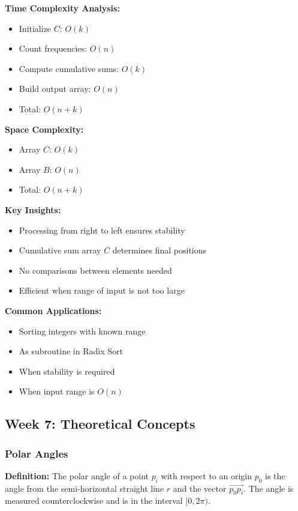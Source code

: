 \textbf{Time Complexity Analysis:}
\begin{itemize}[noitemsep]
    \item Initialize $C$: $O(k)$
    \item Count frequencies: $O(n)$
    \item Compute cumulative sums: $O(k)$
    \item Build output array: $O(n)$
    \item Total: $O(n + k)$
\end{itemize}

\textbf{Space Complexity:}
\begin{itemize}[noitemsep]
    \item Array $C$: $O(k)$
    \item Array $B$: $O(n)$
    \item Total: $O(n + k)$
\end{itemize}

\textbf{Key Insights:}
\begin{itemize}[noitemsep]
    \item Processing from right to left ensures stability
    \item Cumulative sum array $C$ determines final positions
    \item No comparisons between elements needed
    \item Efficient when range of input is not too large
\end{itemize}

\textbf{Common Applications:}
\begin{itemize}[noitemsep]
    \item Sorting integers with known range
    \item As subroutine in Radix Sort
    \item When stability is required
    \item When input range is $O(n)$
\end{itemize}

\subsection{Week 7: Theoretical Concepts}
\subsubsection{Polar Angles}
\textbf{Definition:} The polar angle of a point $p_i$ with respect to an origin $p_0$ is the angle from the semi-horizontal straight line $r$ and the vector $\overrightarrow{p_0p_i}$. The angle is measured counterclockwise and is in the interval $[0, 2\pi)$.

